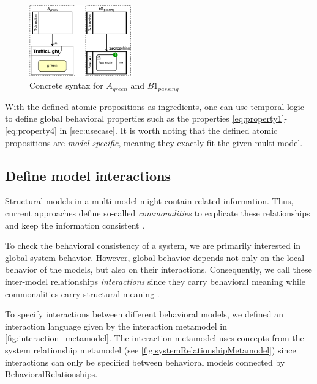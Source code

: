 \documentclass{jot}
\begin{document}
\begin{figure}[h]
    \centering
    \includegraphics[width=0.4\textwidth]{figures/atomic_props_concrete.pdf}
    \caption{Concrete syntax for $A_{green}$ and $B1_{passing}$}
    \label{fig:atomic_propositions_concrete}
\end{figure}

With the defined atomic propositions as ingredients, one can use temporal logic to define global behavioral properties such as the properties \ref{eq:property1}-\ref{eq:property4} in \autoref{sec:usecase}.
It is worth noting that the defined atomic propositions are \textit{model-specific}, meaning they exactly fit the given multi-model.


\subsection{Define model interactions}
Structural models in a multi-model might contain related information.
Thus, current approaches define so-called \emph{commonalities} to explicate these relationships and keep the information consistent \cite{stunkelComprehensiveSystemsFormal2021,klareCommonalitiesPreservingConsistency2019}.

To check the behavioral consistency of a system, we are primarily interested in global system behavior.
However, global behavior depends not only on the local behavior of the models, but also on their interactions.
Consequently, we call these inter-model relationships \emph{interactions} since they carry behavioral meaning while commonalities carry structural meaning \cite{krauterBehavioralConsistencyHeterogeneous2021}.

To specify interactions between different behavioral models, we defined an interaction language given by the interaction metamodel in \autoref{fig:interaction_metamodel}.
The interaction metamodel uses concepts from the system relationship metamodel (see \autoref{fig:systemRelationshipMetamodel}) since interactions can only be specified between behavioral models connected by \textsf{BehavioralRelationship}s.
\end{document}

